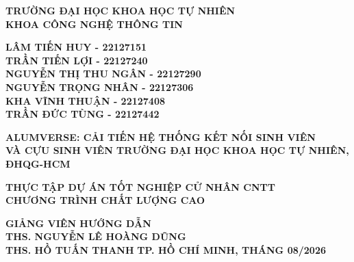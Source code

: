 \documentclass[12pt,a4paper,oneside]{report}
\begin{document}
\newpage
\thispagestyle{empty}
\begin{center}
{\fontsize{12}{16}\selectfont \textbf{TRƯỜNG ĐẠI HỌC KHOA HỌC TỰ NHIÊN}}\\[2pt]
{\fontsize{12}{16}\selectfont \textbf{KHOA CÔNG NGHỆ THÔNG TIN}}

\par\vspace{1.5cm}
{\fontsize{12}{18}\selectfont \textbf{LÂM TIẾN HUY - 22127151}}\\[3pt]
{\fontsize{12}{18}\selectfont \textbf{TRẦN TIẾN LỢI - 22127240}}\\[3pt]
{\fontsize{12}{18}\selectfont \textbf{NGUYỄN THỊ THU NGÂN - 22127290}}\\[3pt]
{\fontsize{12}{18}\selectfont \textbf{NGUYỄN TRỌNG NHÂN - 22127306}}\\[3pt]
{\fontsize{12}{18}\selectfont \textbf{KHA VĨNH THUẬN - 22127408}}\\[3pt]
{\fontsize{12}{18}\selectfont \textbf{TRẦN ĐỨC TÙNG - 22127442}}

\par\vspace{2cm}
{\fontsize{15}{21.5}\selectfont\bfseries ALUMVERSE: CẢI TIẾN HỆ THỐNG KẾT NỐI SINH VIÊN\\[6pt]
VÀ CỰU SINH VIÊN TRƯỜNG ĐẠI HỌC KHOA HỌC TỰ NHIÊN, ĐHQG-HCM}

\par\vspace{1.5cm}
{\fontsize{12}{18}\selectfont\bfseries THỰC TẬP DỰ ÁN TỐT NGHIỆP CỬ NHÂN CNTT}\\[6pt]
{\fontsize{12}{18}\selectfont\bfseries CHƯƠNG TRÌNH CHẤT LƯỢNG CAO}

\par\vspace{1.5cm}
{\fontsize{12}{18}\selectfont
\textbf{GIẢNG VIÊN HƯỚNG DẪN}\\[4pt]
\textbf{THS. NGUYỄN LÊ HOÀNG DŨNG}\\[3pt]
\textbf{THS. HỒ TUẤN THANH}}
\vfill
{\fontsize{12}{18}\selectfont\bfseries TP. HỒ CHÍ MINH, THÁNG 08/2026}
\end{center}
\newpage
\end{document}
